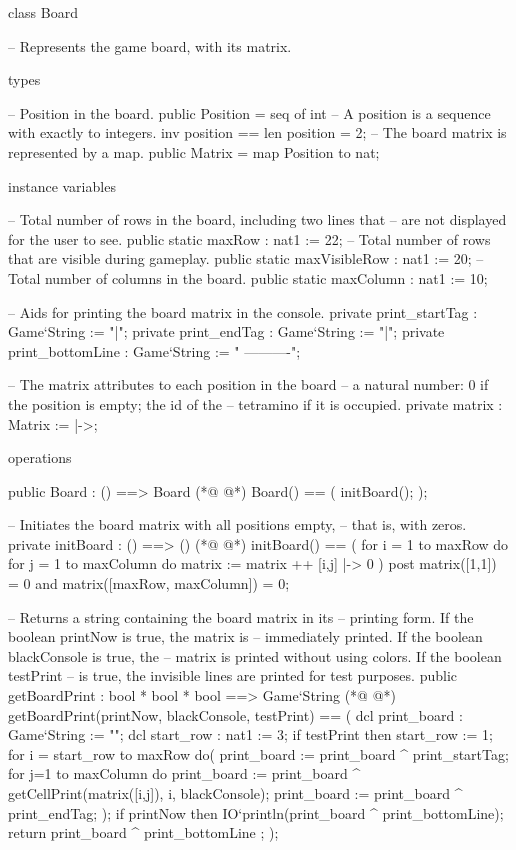 \begin{vdmpp}[breaklines=true]
class Board

 -- Represents the game board, with its matrix.


 types
  
  -- Position in the board.
  public Position = seq of int
  -- A position is a sequence with exactly to integers.
  inv position == len position = 2;
  -- The board matrix is represented by a map.
  public Matrix = map Position to nat;


 instance variables
 
  -- Total number of rows in the board, including two lines that
  -- are not displayed for the user to see.
  public static maxRow  : nat1   := 22;
  -- Total number of rows that are visible during gameplay.
  public static maxVisibleRow : nat1   := 20;
  -- Total number of columns in the board.
  public static maxColumn  : nat1   := 10;

  -- Aids for printing the board matrix in the console.
  private print_startTag  : Game`String := "|";
  private print_endTag  : Game`String := "|\n";
  private print_bottomLine : Game`String := " ----------";
                                       
  -- The matrix attributes to each position in the board
  -- a natural number: 0 if the position is empty; the id of the
  -- tetramino if it is occupied.
  private matrix     : Matrix  := {|->};
     
                                                      
 operations
 
  public Board : () ==> Board
(*@
\label{Board:40}
@*)
  Board() == ( 
   initBoard();
  );
  
  -- Initiates the board matrix with all positions empty,
  -- that is, with zeros.
  private initBoard : () ==> ()
(*@
\label{initBoard:47}
@*)
  initBoard() == (  
   for i = 1 to maxRow do
    for j = 1 to maxColumn do
     matrix := matrix ++ {[i,j] |-> 0}
  )
  post matrix([1,1]) = 0 and matrix([maxRow, maxColumn]) = 0;

  -- Returns a string containing the board matrix in its
  -- printing form. If the boolean printNow is true, the matrix is
  -- immediately printed. If the boolean blackConsole is true, the
  -- matrix is printed without using colors. If the boolean testPrint
  -- is true, the invisible lines are printed for test purposes.
  public getBoardPrint : bool * bool * bool ==> Game`String
(*@
\label{getBoardPrint:60}
@*)
  getBoardPrint(printNow, blackConsole, testPrint) == ( 
   dcl print_board : Game`String := "\n";
   dcl start_row : nat1 := 3;
   if testPrint then start_row := 1;   
   for i = start_row to maxRow do(
    print_board := print_board ^ print_startTag;
      for j=1 to maxColumn do
       print_board := print_board 
        ^ getCellPrint(matrix([i,j]), i, blackConsole);
      print_board := print_board ^  print_endTag;
     );
     if printNow then
      IO`println(print_board ^ print_bottomLine);
    return print_board ^ print_bottomLine ;                   
  );
  

\end{vdmpp}
